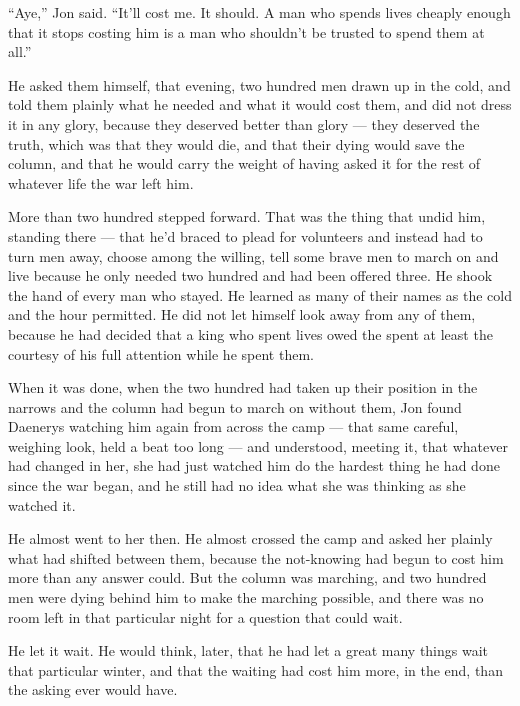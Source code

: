 “Aye,” Jon said. “It’ll cost me. It should. A man who spends lives cheaply enough that it stops costing him is a man who shouldn’t be trusted to spend them at all.”

\sceneBreak

He asked them himself, that evening, two hundred men drawn up in the cold, and told them plainly what he needed and what it would cost them, and did not dress it in any glory, because they deserved better than glory — they deserved the truth, which was that they would die, and that their dying would save the column, and that he would carry the weight of having asked it for the rest of whatever life the war left him.

More than two hundred stepped forward. That was the thing that undid him, standing there — that he’d braced to plead for volunteers and instead had to turn men away, choose among the willing, tell some brave men to march on and live because he only needed two hundred and had been offered three. He shook the hand of every man who stayed. He learned as many of their names as the cold and the hour permitted. He did not let himself look away from any of them, because he had decided that a king who spent lives owed the spent at least the courtesy of his full attention while he spent them.

When it was done, when the two hundred had taken up their position in the narrows and the column had begun to march on without them, Jon found Daenerys watching him again from across the camp — that same careful, weighing look, held a beat too long — and understood, meeting it, that whatever had changed in her, she had just watched him do the hardest thing he had done since the war began, and he still had no idea what she was thinking as she watched it.

He almost went to her then. He almost crossed the camp and asked her plainly what had shifted between them, because the not-knowing had begun to cost him more than any answer could. But the column was marching, and two hundred men were dying behind him to make the marching possible, and there was no room left in that particular night for a question that could wait.

He let it wait. He would think, later, that he had let a great many things wait that particular winter, and that the waiting had cost him more, in the end, than the asking ever would have.